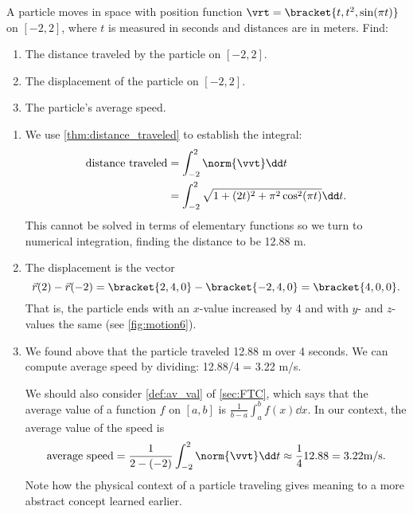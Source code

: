\begin{example}\label{ex_motion6}
A particle moves in space with position function $\vrt =\bracket{t,t^2,\sin (\pi t)}$ on $[-2,2]$, where $t$ is measured in seconds and distances are in meters. Find:
\begin{enumerate}
	\item The distance traveled by the particle on $[-2,2]$.
	\item	The displacement of the particle on $[-2,2]$.
	\item	The particle's average speed.
\end{enumerate}
\solution
\begin{enumerate}
	\item We use \autoref{thm:distance_traveled} to establish the integral:
	\begin{align*}
	\text{distance traveled}
	&= \int_{-2}^2 \norm{\vvt}\dd t \\
	&= \int_{-2}^2 \sqrt{1+(2t)^2+ \pi^2\cos^2(\pi t)}\dd t.
	\end{align*}
	This cannot be solved in terms of elementary functions so we turn to numerical integration, finding the distance to be 12.88 m.
	
	\iftoggle{in_threeD}{%
	\mtable{The path of the particle in \autoref{ex_motion6}.}{fig:motion6}{
	\myincludeasythree{width=\marginparwidth,
3Droll=-1.3988262638349023,
3Dortho=0.004399999976158142,
3Dc2c=0.5026575922966003 0.7320348024368286 0.4598483145236969,
3Dcoo=-14.488340377807617 25.037630081176758 5.939126491546631,
3Droo=150.0000062372992}{width=\marginparwidth}{figures/figmotion6_3D}}
	}%
	{%
	\mtable{The path of the particle, from two perspectives, in \autoref{ex_motion6}.}{fig:motion6}{%
	\myincludegraphics[width=\marginparwidth]{figures/figmotion6}\\[-20pt]
	(a)\\[20pt]
	\myincludegraphics[width=\marginparwidth]{figures/figmotion6_3D}\\
	(b)
	}%
	}%
	
	\item	The displacement is the vector
	\[\vec r(2)-\vec r(-2) =\bracket{2,4,0}-\bracket{-2,4,0}=\bracket{4,0,0}.\]
	That is, the particle ends with an $x$-value increased by 4 and with $y$- and $z$-values the same (see \autoref{fig:motion6}).
	
	\item	We found above that the particle traveled 12.88 m over 4 seconds. We can compute average speed by dividing: 12.88/4 = 3.22 m/s. 
	
	We should also consider \autoref{def:av_val} of \autoref{sec:FTC}, which says that the average value of a function $f$ on $[a,b]$ is $\frac{1}{b-a}\int_a^b f(x)\dd x$. In our context, the average value of the speed is
	\[
	\text{average speed} = \frac{1}{2-(-2)}\int_{-2}^2 \norm{\vvt}\dd t \approx \frac14 12.88 = 3.22\text{m/s}.
	\]
	Note how the physical context of a particle traveling gives meaning to a more abstract concept learned earlier.
\end{enumerate}
\end{example}

